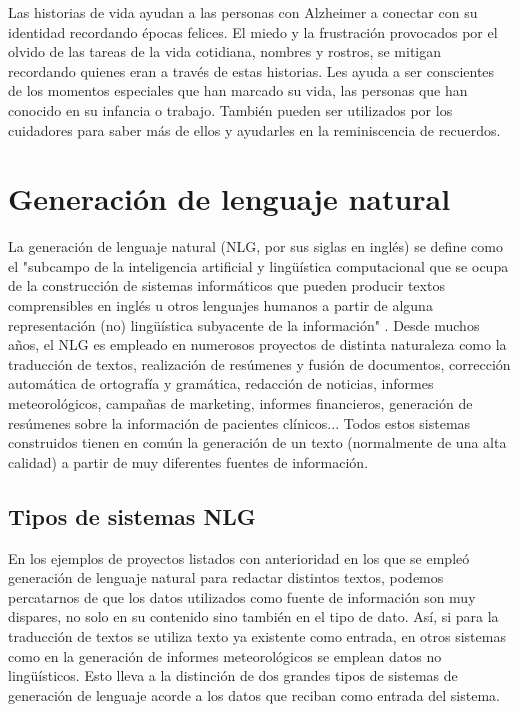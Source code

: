 Las historias de vida ayudan a las personas con Alzheimer a conectar con su identidad recordando épocas felices. El miedo y la frustración provocados por el olvido de las tareas de la vida cotidiana, nombres y rostros, se mitigan recordando quienes eran a través de estas historias. Les ayuda a ser conscientes de los momentos especiales que han marcado su vida, las personas que han conocido en su infancia o trabajo. También pueden ser utilizados por los cuidadores para saber más de ellos y ayudarles en la reminiscencia de recuerdos.



\section{Generación de lenguaje natural}

La generación de lenguaje natural (NLG, por sus siglas en inglés) se define como el "subcampo de la inteligencia artificial y lingüística computacional que se ocupa de la construcción de sistemas informáticos que pueden producir textos comprensibles en inglés u otros lenguajes humanos a partir de alguna representación (no) lingüística subyacente de la información" \citep{reiter1997building}. Desde muchos años, el NLG es empleado en numerosos proyectos de distinta naturaleza como la traducción de textos, realización de resúmenes y fusión de documentos, corrección automática de ortografía y gramática, redacción de noticias, informes meteorológicos, campañas de marketing, informes financieros, generación de resúmenes sobre la información de pacientes clínicos... Todos estos sistemas construidos tienen en común la generación de un texto (normalmente de una alta calidad) a partir de muy diferentes fuentes de información. 

\subsection{Tipos de sistemas NLG}
En los ejemplos de proyectos listados con anterioridad en los que se empleó generación de lenguaje natural para redactar distintos textos, podemos percatarnos de que los datos utilizados como fuente de información son muy dispares, no solo en su contenido sino también en el tipo de dato. Así, si para la traducción de textos se utiliza texto ya existente como entrada, en otros sistemas como en la generación de informes meteorológicos se emplean datos no lingüísticos. Esto lleva a la distinción de dos grandes tipos de sistemas de generación de lenguaje acorde a los datos que reciban como entrada del sistema.


